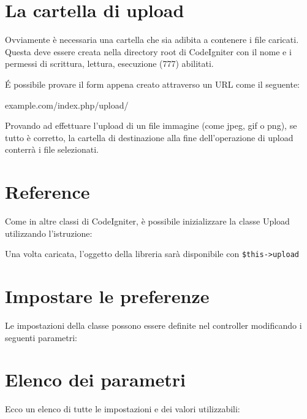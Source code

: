 \section*{La cartella di upload}
Ovviamente è necessaria una cartella che sia adibita a contenere i file caricati. Questa deve essere creata nella directory root di CodeIgniter con il nome  e i permessi di scrittura, lettura, esecuzione (777) abilitati.

\'E possibile provare il form appena creato attraverso un \ac{URL} come il seguente:

\begin{code}
example.com/index.php/upload/
\end{code}

Provando ad effettuare l'upload di un file immagine (come jpeg, gif o png), se tutto è corretto, la cartella di destinazione alla fine dell'operazione di upload conterrà i file selezionati.

\section*{Reference}
Come in altre classi di CodeIgniter, è possibile inizializzare la classe Upload utilizzando l'istruzione:


Una volta caricata, l'oggetto della libreria sarà disponibile con \verb|$this->upload|

\section*{Impostare le preferenze}
Le impostazioni della classe possono essere definite nel controller modificando i seguenti parametri:


\section*{Elenco dei parametri}
Ecco un elenco di tutte le impostazioni e dei valori utilizzabili:

